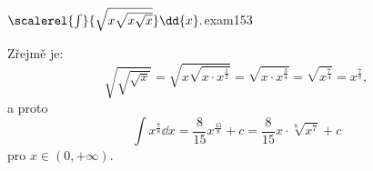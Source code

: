 \begin{mathexam}{\(\protect\scalerel{\int}{\sqrt{x\sqrt{x\sqrt{x}}}}\dd{x}.\)}{exam153} 

  Zřejmě je: 
  \[
    \sqrt{\sqrt{\sqrt{x}}} = \sqrt{{x}\sqrt{x\cdot x^{\frac{1}{2}}}} = \sqrt{x\cdot x^{\frac{3}{4}}}
      = \sqrt{x^\frac{7}{4}} = x^{\frac{7}{8}},
  \]
  a proto
  \[
    \int x^{\frac{7}{8}}\dd{x} = \frac{8}{15}x^{\frac{15}{8}} + c 
      = \frac{8}{15}x\cdot\sqrt[8]{x^7} + c
  \]
  pro \(x\in(0,+\infty)\).
\end{mathexam}